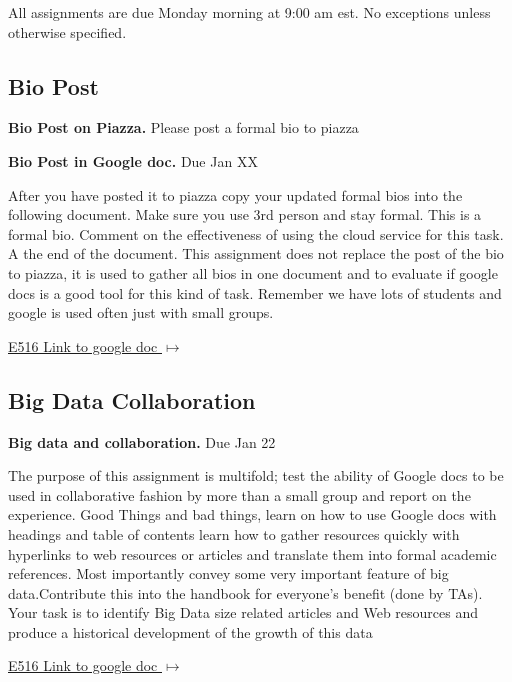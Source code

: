 All assignments are due Monday morning at 9:00 am est. No exceptions unless otherwise specified.

\subsection{Bio Post}

\begin{exercise} \label{a:e516-bio-piazza}

{\bf Bio Post on Piazza.} Please post a formal bio to piazza

\end{exercise}

\begin{exercise} \label{a:e516-bio-googledocs}

 {\bf Bio Post in Google doc.} Due Jan XX
 
 After you have posted it to piazza copy your updated formal bios into the following document.  Make sure you use 3rd person and stay formal. This is a formal bio. Comment on the effectiveness of using the cloud service for this task. A the end of the document. This assignment does not replace the post of the bio to piazza, it is used to gather all bios in one document and to evaluate if google docs is a good tool for this kind of task. Remember we have lots of students and google is used often just with small groups.

 \smallskip

 {\hfill \href{https://docs.google.com/document/d/1ejzlKYqC3dLac8WXVpcPQsJh1j4BDqRxxgGg1cFQbeQ/edit?usp=sharing}{E516 Link to google doc $\mapsto$}}

 \end{exercise}

\subsection{Big Data Collaboration}

\begin{exercise} \label{a:e516-big-data-and-collaboration}

{\bf Big data and collaboration.} Due Jan 22

The purpose of this assignment is multifold; test the ability of Google docs to be used in collaborative fashion by more than a small group and report on the experience. Good Things and bad things, learn on how to use Google docs with headings and table of contents learn how to gather resources quickly with hyperlinks to web resources or articles and translate them into formal academic references. Most importantly convey some very important feature of big data.Contribute this into the handbook for everyone's benefit (done by TAs). Your task is to identify Big Data size related articles and Web resources and produce a historical development of the growth of this data

  {\hfill \href{https://docs.google.com/document/d/1ZHNdhX_Jx7uBQo0kthSYQ6TQR8_KNbgOwH2EuqBQcjY/edit?usp=sharing}{E516 Link to google doc $\mapsto$}}
 
\end{exercise}

